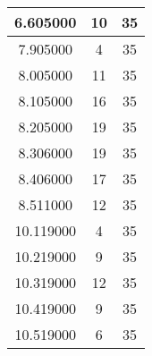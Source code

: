 \begin{longtable}[htbp]{|c|c|c|}
6.605000 & 10 & 35 \\ \hline
7.905000 & 4 & 35 \\ \hline
8.005000 & 11 & 35 \\ \hline
8.105000 & 16 & 35 \\ \hline
8.205000 & 19 & 35 \\ \hline
8.306000 & 19 & 35 \\ \hline
8.406000 & 17 & 35 \\ \hline
8.511000 & 12 & 35 \\ \hline
10.119000 & 4 & 35 \\ \hline
10.219000 & 9 & 35 \\ \hline
10.319000 & 12 & 35 \\ \hline
10.419000 & 9 & 35 \\ \hline
10.519000 & 6 & 35 \\ \hline
\end{longtable}
